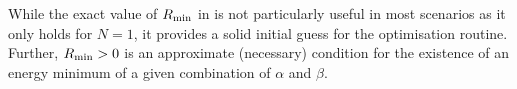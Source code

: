 While the exact value of $R_{\rm min}$ in  is not particularly useful in most scenarios as it only holds for $N = 1$, it provides a solid initial guess for the optimisation routine.
Further, $R_{\rm min} > 0$ is an approximate (necessary) condition for the existence of an energy minimum of a given combination of $\alpha$ and $\beta$.
